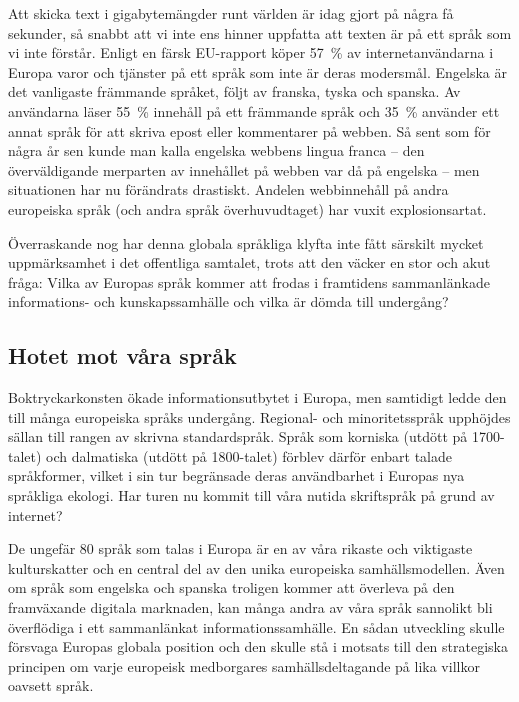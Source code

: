 \begin{multicols}{2}
Att skicka text i gigabytemängder runt världen är idag gjort på några
få sekunder, så snabbt att vi inte ens hinner uppfatta att texten är
på ett språk som vi inte förstår. Enligt en färsk EU-rapport köper
57~\% av internet\-an\-vänd\-ar\-na i Europa varor och tjänster på ett
språk som inte är deras modersmål. Engelska är det vanligaste
främmande språket, följt av franska, tyska och spanska. Av användarna
läser 55~\% innehåll på ett främmande språk och 35~\% använder ett
annat språk för att skriva epost eller kommentarer på webben. Så sent
som för några år sen kunde man kalla engelska webbens lingua franca --
den överväldigande merparten av innehållet på webben var då på
engelska -- men situationen har nu förändrats drastiskt. Andelen
webbinnehåll på andra europeiska språk (och andra språk
överhuvudtaget) har vuxit explosionsartat.

Överraskande nog har denna globala språkliga klyfta inte fått särskilt
mycket uppmärksamhet i det offentliga samtalet, trots att den väcker
en stor och akut fråga: Vilka av Europas språk kommer att frodas i
framtidens samman\-länkade informa\-tions- och kun\-skaps\-sam\-hälle
och vilka är dömda till undergång?


\subsection{Hotet mot våra språk}

Boktryckarkonsten ökade informations\-ut\-bytet i Europa, men
sam\-tidigt ledde den till många europeiska språks
under\-gång. Regional- och minoritets\-språk upphöjdes sällan till
rangen av skrivna standard\-språk. Språk som korniska (utdött på
1700-talet) och dalmatiska (utdött på 1800-talet) förblev därför
enbart talade språkformer, vilket i sin tur begränsade deras
användbarhet i Europas nya språkliga ekologi. Har turen nu kommit till
våra nutida skriftspråk på grund av internet?


De ungefär 80 språk som talas i Europa är en av våra rikaste och
viktigaste kulturskatter och en central del av den unika europeiska
samhällsmodellen. Även om språk som engelska och spanska troligen
kommer att överleva på den framväxande digitala marknaden, kan många
andra av våra språk sannolikt bli överflödiga i ett samman\-länkat
informa\-tions\-samhälle. En sådan utveckling skulle försvaga Europas
globala position och den skulle stå i motsats till den strategiska
principen om varje europeisk medborgares samhällsdeltagande på lika
villkor oavsett språk.


\end{multicols}
